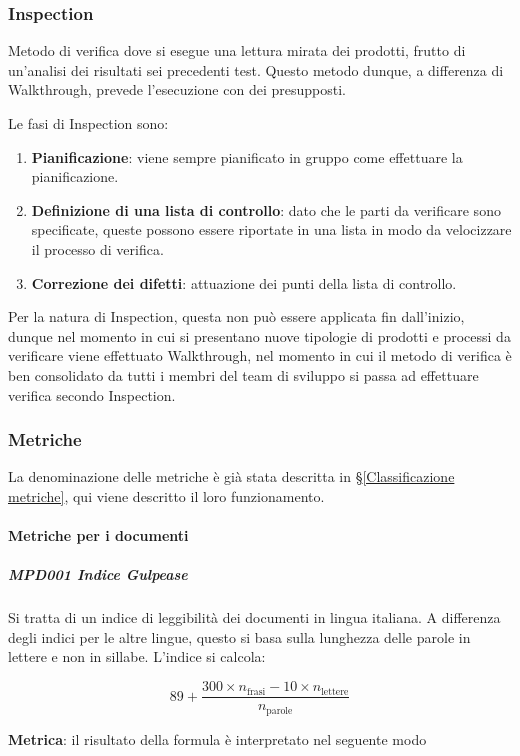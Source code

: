 		\subsubsection*{Inspection}
		Metodo di verifica dove si esegue una lettura mirata dei prodotti, frutto di un'analisi dei risultati sei precedenti test. Questo metodo dunque, a differenza di Walkthrough, prevede l'esecuzione con dei presupposti.
		
		Le fasi di Inspection sono:
		
		\begin{enumerate}
			\item \textbf{Pianificazione}: viene sempre pianificato in gruppo come effettuare la pianificazione.
			\item \textbf{Definizione di una lista di controllo}: dato che le parti da verificare sono specificate, queste possono essere riportate in una lista in modo da velocizzare il processo di verifica.
			\item \textbf{Correzione dei difetti}: attuazione dei punti della lista di controllo.
		\end{enumerate}
	
	Per la natura di Inspection, questa non può essere applicata fin dall'inizio, dunque nel momento in cui si presentano nuove tipologie di prodotti e processi da verificare viene effettuato Walkthrough, nel momento in cui il metodo di verifica è ben consolidato da tutti i membri del team di sviluppo si passa ad effettuare verifica secondo Inspection.  
		
		\subsubsection{Metriche}
		La denominazione delle metriche è già stata descritta in \S\ref{Classificazione metriche}, qui viene descritto il loro funzionamento.
			\paragraph{Metriche per i documenti}
				\subparagraph{MPD001 Indice Gulpease}
				Si tratta di un indice di leggibilità dei documenti in lingua italiana. A differenza degli indici per le altre lingue, questo si basa sulla
				lunghezza delle parole in lettere e non in sillabe. L'indice si calcola:

				\[89+\dfrac{300\times n_{\text{frasi}}-10\times n_{\text{lettere}}}{n_{\text{parole}}}\]

				\textbf{Metrica}: il risultato della formula è interpretato nel seguente modo

